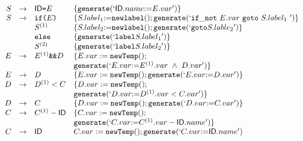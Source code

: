 \documentclass[dvipdfmx]{jarticle}
\begin{document}
\[
\begin{array}{rcll}
    S & \rightarrow & \mathsf{ID}\texttt{=} E & \{{\tt generate(`}{\mathsf{ID}.name}{\tt :=}{E.var}{\tt ')}\}\\
    S & \rightarrow & \texttt{if}\texttt{(} E\texttt{)} & 
    \{S.label_1{\rm :=}{\tt newlabel()};
    {\tt generate(`if\_not}\ {E.var}\ {\tt goto}\ {S.label_1}\ {\tt ')}\}\\
    & & S^{(1)} & \{S.label_2{\rm :=}{\tt newlabel()};
    {\tt generate(`goto }{S.lable_2}{\tt ')}\}\\
    & & \texttt{else} & \{{\tt generate(`label }{S.label_1}{\tt ')}\}\\
    & & S^{(2)} & \{{\tt generate(`label }{S.label_2}{\tt ')}\}\\
    E & \rightarrow & E^{(1)} \texttt{\&\&} D & \{E.var:={\tt newTemp()};\\
    & & & {\tt generate(`}{E.var}{\tt :=}{E^{(1)}.var\ \wedge\ D.var}{\tt ')}\}\\
    E & \rightarrow & D & \{E.var:={\tt newTemp()};{\tt generate(`}{E.var}{\tt :=}{D.var}{\tt ')}\}\\
    D & \rightarrow & D^{(1)}< C & \{D.var:={\tt newTemp()};\\
    & & & {\tt generate(`}{D.var}{\tt :=}{D^{(1)}.var<C.var}{\tt ')}\}\\
    D & \rightarrow & C & \{D.var:={\tt newTemp()};{\tt generate(`}{D.var}{\tt :=}{C.var}{\tt ')}\}\\
    C & \rightarrow & C^{(1)}-\mathsf{ID} & \{C.var:={\tt newTemp()};\\
      &  & & {\tt generate(`}{C.var}{\tt :=}{C^{(1)}.var-\mathsf{ID}.name}{\tt ')}\}\\
    C & \rightarrow & \mathsf{ID} & C.var:={\tt newTemp()};
    {\tt generate(`}{C.var}{\tt :=}{\mathsf{ID}.name}{\tt ')}
\end{array}\]
\end{document}
